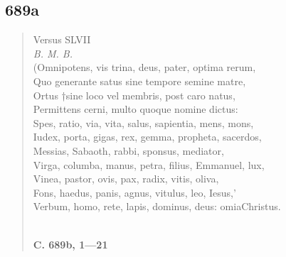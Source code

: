 \documentclass[11pt, a4paper]{report}
\begin{document}
            \subsection*{689a}
      \begin{verse}
      Versus SLVII \\ \textit{B. M. B.} \\ (Omnipotens, vis trina, deus, pater, optima rerum, \\ Quo generante satus sine tempore semine matre, \\ Ortus †sine loco vel membris, post caro natus, \\ Permittens cerni, multo quoque nomine dictus: \\ Spes, ratio, via, vita, salus, sapientia, mens, mons, \\ Iudex, porta, gigas, rex, gemma, propheta, sacerdos, \\ Messias, Sabaoth, rabbi, sponsus, mediator, \\ Virga, columba, manus, petra, filius, Emmanuel, lux, \\ Vinea, pastor, ovis, pax, radix, vitis, oliva, \\ Fons, haedus, panis, agnus, vitulus, leo, Iesus,’ \\ Verbum, homo, rete, lapis, dominus, deus: omiaChristus. \\ 
        ﻿\pagebreak 
    \begin{center} \textbf{C. 689b, 1—21} \end{center} \marginpar{[163]} 
      \end{verse}
  
\end{document}
